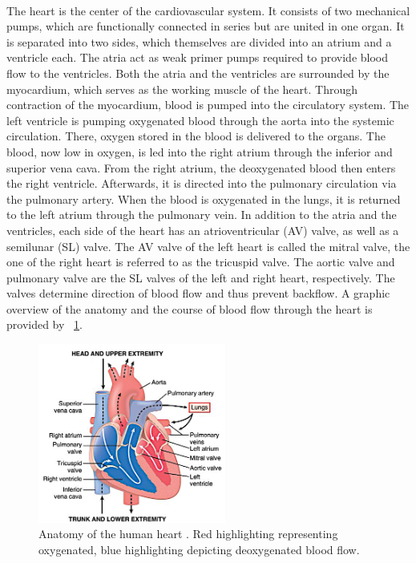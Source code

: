  \\The heart is the center of the cardiovascular system. It consists of two mechanical pumps, which are functionally connected in series but are united in one organ. It is separated into two sides, which themselves are divided into an atrium and a ventricle each. The atria act as weak primer pumps required to provide blood flow to the ventricles. \cite{HKS4} Both the atria and the ventricles are surrounded by the myocardium, which serves as the working muscle of the heart. Through contraction of the myocardium, blood is pumped into the circulatory system. \cite{HKS7} The left ventricle is pumping oxygenated blood through the aorta into the systemic circulation. There, oxygen stored in the blood is delivered to the organs. The blood, now low in oxygen, is led into the right atrium through the inferior and superior vena cava. From the right atrium, the deoxygenated blood then enters the right ventricle. Afterwards, it is directed into the pulmonary circulation via the pulmonary artery. When the blood is oxygenated in the lungs, it is returned to the left atrium through the pulmonary vein. \cite{HKS4} In addition to the atria and the ventricles, each side of the heart has an atrioventricular (AV) valve, as well as a semilunar (SL) valve. The AV valve of the left heart is called the mitral valve, the one of the right heart is referred to as the tricuspid valve. The aortic valve and pulmonary valve are the SL valves of the left and right heart, respectively. The valves determine direction of blood flow and thus prevent backflow. \cite{HKS7} A graphic overview of the anatomy and the course of blood flow through the heart is provided by \figurename~\ref{fig:heart_anat}.
 \begin{figure}[ht]
   \centering
   \includegraphics[width=0.55\textwidth]{images/chapt_2/heart_1.jpg}
   \caption[Anatomy of the human heart \cite{GH20}]{Anatomy of the human heart \cite{GH20}. Red highlighting representing oxygenated, blue highlighting depicting deoxygenated blood flow.}
   \label{fig:heart_anat}
 \end{figure}
